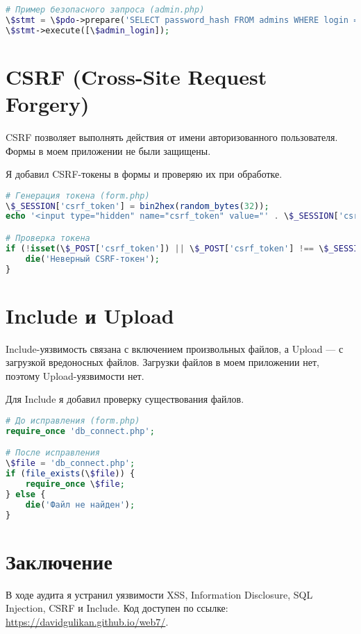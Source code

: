 \documentclass[a4paper,12pt]{article}
\begin{document}
\begin{lstlisting}[language=PHP, caption=Защита от SQL Injection]
# Пример безопасного запроса (admin.php)
\$stmt = \$pdo->prepare('SELECT password_hash FROM admins WHERE login = ?');
\$stmt->execute([\$admin_login]);
\end{lstlisting}

\section{CSRF (Cross-Site Request Forgery)}
CSRF позволяет выполнять действия от имени авторизованного пользователя. Формы в моем приложении не были защищены.

Я добавил CSRF-токены в формы и проверяю их при обработке.

\begin{lstlisting}[language=PHP, caption=Защита от CSRF]
# Генерация токена (form.php)
\$_SESSION['csrf_token'] = bin2hex(random_bytes(32));
echo '<input type="hidden" name="csrf_token" value="' . \$_SESSION['csrf_token'] . '">';

# Проверка токена
if (!isset(\$_POST['csrf_token']) || \$_POST['csrf_token'] !== \$_SESSION['csrf_token']) {
    die('Неверный CSRF-токен');
}
\end{lstlisting}

\section{Include и Upload}
Include-уязвимость связана с включением произвольных файлов, а Upload — с загрузкой вредоносных файлов. Загрузки файлов в моем приложении нет, поэтому Upload-уязвимости нет.

Для Include я добавил проверку существования файлов.

\begin{lstlisting}[language=PHP, caption=Защита от Include]
# До исправления (form.php)
require_once 'db_connect.php';

# После исправления
\$file = 'db_connect.php';
if (file_exists(\$file)) {
    require_once \$file;
} else {
    die('Файл не найден');
}
\end{lstlisting}

\section*{Заключение}
В ходе аудита я устранил уязвимости XSS, Information Disclosure, SQL Injection, CSRF и Include. Код доступен по ссылке: \url{https://davidgulikan.github.io/web7/}.
\end{document}
